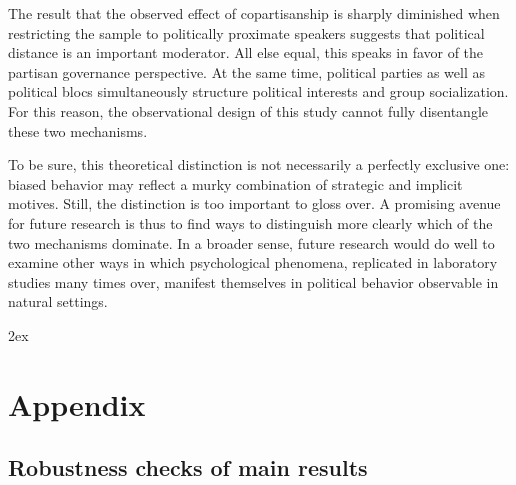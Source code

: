 \documentclass[12pt,a4paper]{article}
\begin{document}
The result that the observed effect of copartisanship is sharply diminished when restricting the sample to politically proximate speakers suggests that political distance is an important moderator. All else equal, this speaks in favor of the partisan governance perspective. At the same time, political parties as well as political blocs simultaneously structure political interests and group socialization. For this reason, the observational design of this study cannot fully disentangle these two mechanisms. 

To be sure, this theoretical distinction is not necessarily a perfectly exclusive one: biased behavior may reflect a murky combination of strategic and implicit motives. Still, the distinction is too important to gloss over. A promising avenue for future research is thus to find ways to distinguish more clearly which of the two mechanisms dominate. In a broader sense, future research would do well to examine other ways in which psychological phenomena, replicated in laboratory studies many times over, manifest themselves in political behavior observable in natural settings.



\newpage
\begingroup
\parindent 0pt
\parskip 2ex
\def\enotesize{\normalsize}
\endgroup

\clearpage






\clearpage

\appendix

\section{Appendix}

\subsection{Robustness checks of main results}\label{approbust}
\end{document}
